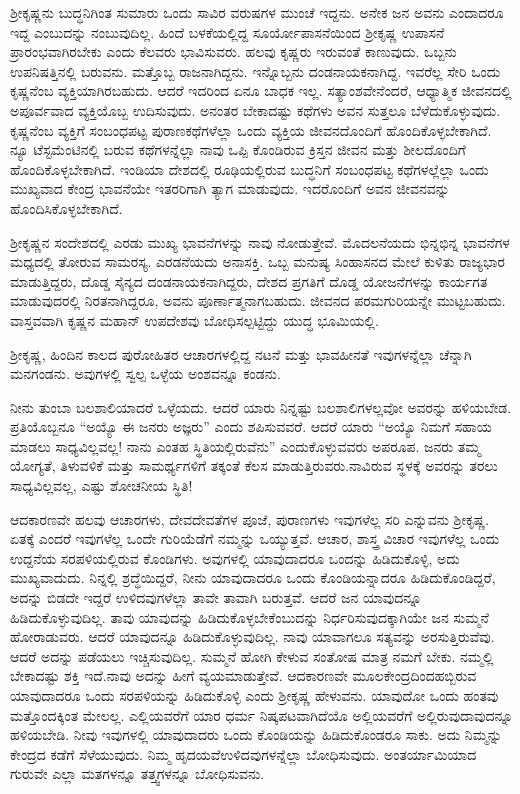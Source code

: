 ಶ‍್ರೀಕೃಷ್ಣನು ಬುದ್ಧನಿಗಿಂತ ಸುಮಾರು ಒಂದು ಸಾವಿರ ವರುಷಗಳ ಮುಂಚೆ ಇದ್ದನು. ಅನೇಕ ಜನ ಅವನು ಎಂದಾದರೂ ಇದ್ದ ಎಂಬುದನ್ನು ನಂಬುವುದಿಲ್ಲ. ಹಿಂದೆ ಬಳಕೆ\-ಯಲ್ಲಿದ್ದ ಸೂರ್ಯೋಪಾಸನೆಯಿಂದ ಶ‍್ರೀಕೃಷ್ಣ ಉಪಾಸನೆ ಪ್ರಾರಂಭವಾಗಿರಬೇಕು ಎಂದು ಕೆಲವರು ಭಾವಿಸುವರು. ಹಲವು ಕೃಷ್ಣರು ಇರುವಂತೆ ಕಾಣುವುದು. ಒಬ್ಬನು ಉಪನಿಷತ್ತಿನಲ್ಲಿ ಬರುವನು. ಮತ್ತೊಬ್ಬ ರಾಜನಾಗಿದ್ದನು. ಇನ್ನೊಬ್ಬನು ದಂಡನಾಯಕ\-ನಾಗಿದ್ದ. ಇವರೆಲ್ಲ ಸೇರಿ ಒಂದು ಕೃಷ್ಣನೆಂಬ ವ್ಯಕ್ತಿಯಾಗಿರಬಹುದು. ಆದರೆ ಇದರಿಂದ ಏನೂ ಬಾಧಕ ಇಲ್ಲ. ಸತ್ಯಾಂಶವೇನೆಂದರೆ, ಆಧ್ಯಾತ್ಮಿಕ ಜೀವನದಲ್ಲಿ ಅಪೂರ್ವವಾದ ವ್ಯಕ್ತಿಯೊಬ್ಬ ಉದಿಸುವುದು. ಅನಂತರ ಬೇಕಾದಷ್ಟು ಕಥೆಗಳು ಅವನ ಸುತ್ತಲೂ ಬೆಳೆದುಕೊಳ್ಳುವುದು. ಕೃಷ್ಣನೆಂಬ ವ್ಯಕ್ತಿಗೆ ಸಂಬಂಧಪಟ್ಟ ಪುರಾಣಕಥೆಗಳೆಲ್ಲಾ ಒಂದು ವ್ಯಕ್ತಿಯ ಜೀವನದೊಂದಿಗೆ ಹೊಂದಿಕೊಳ್ಳಬೇಕಾಗಿದೆ. ನ್ಯೂ ಟೆಸ್ಟಮೆಂಟಿನಲ್ಲಿ ಬರುವ ಕಥೆಗಳನ್ನೆಲ್ಲಾ ನಾವು ಒಪ್ಪಿ \-ಕೊಂಡಿರುವ ಕ್ರಿಸ್ತನ ಜೀವನ ಮತ್ತು ಶೀಲದೊಂದಿಗೆ ಹೊಂದಿಕೊಳ್ಳಬೇಕಾಗಿದೆ. ಇಂಡಿಯಾ ದೇಶದಲ್ಲಿ ರೂಢಿಯಲ್ಲಿರುವ ಬುದ್ಧನಿಗೆ ಸಂಬಂಧಪಟ್ಟ ಕಥೆಗಳಲ್ಲೆಲ್ಲಾ ಒಂದು ಮುಖ್ಯವಾದ ಕೇಂದ್ರ ಭಾವನೆಯೇ ಇತರರಿಗಾಗಿ ತ್ಯಾಗ ಮಾಡುವುದು. ಇದರೊಂದಿಗೆ ಅವನ ಜೀವನವನ್ನು ಹೊಂದಿಸಿಕೊಳ್ಳಬೇಕಾಗಿದೆ.

ಶ‍್ರೀಕೃಷ್ಣನ ಸಂದೇಶದಲ್ಲಿ ಎರಡು ಮುಖ್ಯ ಭಾವನೆಗಳನ್ನು ನಾವು ನೋಡುತ್ತೇವೆ. ಮೊದಲನೆಯದು ಭಿನ್ನಭಿನ್ನ ಭಾವನೆಗಳ ಮಧ್ಯದಲ್ಲಿ ತೋರುವ ಸಾಮರಸ್ಯ. ಎರಡನೆಯದು ಅನಾಸಕ್ತಿ. ಒಬ್ಬ ಮನುಷ್ಯ ಸಿಂಹಾಸನದ ಮೇಲೆ ಕುಳಿತು ರಾಜ್ಯಭಾರ ಮಾಡುತ್ತಿದ್ದರು, ದೊಡ್ಡ ಸೈನ್ಯದ ದಂಡನಾಯಕನಾಗಿದ್ದರು, ದೇಶದ ಪ್ರಗತಿಗೆ ದೊಡ್ಡ ಯೋಜನೆಗಳನ್ನು ಕಾರ್ಯಗತ ಮಾಡುವುದರಲ್ಲಿ ನಿರತನಾಗಿದ್ದರೂ, ಅವನು ಪೂರ್ಣಾತ್ಮನಾಗಬಹುದು. ಜೀವನದ ಪರಮಗುರಿಯನ್ನೇ ಮುಟ್ಟಬಹುದು. ವಾಸ್ತವವಾಗಿ ಕೃಷ್ಣನ ಮಹಾನ್​ ಉಪದೇಶವು ಬೋಧಿಸಲ್ಪಟ್ಟಿದ್ದು ಯುದ್ಧ ಭೂಮಿಯಲ್ಲಿ.

ಶ‍್ರೀಕೃಷ್ಣ, ಹಿಂದಿನ ಕಾಲದ ಪುರೋಹಿತರ ಆಚಾರಗಳಲ್ಲಿದ್ದ ನಟನೆ ಮತ್ತು ಭಾವಹೀನತೆ ಇವುಗಳನ್ನೆಲ್ಲಾ ಚೆನ್ನಾಗಿ ಮನಗಂಡನು. ಅವುಗಳಲ್ಲಿ ಸ್ವಲ್ಪ ಒಳ್ಳೆಯ ಅಂಶವನ್ನೂ ಕಂಡನು.

ನೀನು ತುಂಬಾ ಬಲಶಾಲಿಯಾದರೆ ಒಳ್ಳೆಯದು. ಆದರೆ ಯಾರು ನಿನ್ನಷ್ಟು ಬಲಶಾಲಿಗಳಲ್ಲವೋ ಅವರನ್ನು ಹಳಿಯಬೇಡ. ಪ್ರತಿಯೊಬ್ಬನೂ “ಅಯ್ಯೊ ಈ ಜನರು ಅಜ್ಞರು” ಎಂದು ಶಪಿಸುವವರೆ. ಆದರೆ ಯಾರು “ಅಯ್ಯೊ ನಿಮಗೆ ಸಹಾಯ ಮಾಡಲು ಸಾಧ್ಯವಿಲ್ಲವಲ್ಲ! ನಾನು ಎಂತಹ ಸ್ಥಿತಿಯಲ್ಲಿರುವೆನು” ಎಂದುಕೊಳ್ಳುವವರು ಅಪರೂಪ. ಜನರು ತಮ್ಮ ಯೋಗ್ಯತೆ, ತಿಳುವಳಿಕೆ ಮತ್ತು ಸಾಮರ್ಥ್ಯಗಳಿಗೆ ತಕ್ಕಂತೆ ಕೆಲಸ ಮಾಡುತ್ತಿರುವರು.\break ನಾವಿರುವ ಸ್ಥಳಕ್ಕೆ ಅವರನ್ನು ತರಲು ಸಾಧ್ಯವಿಲ್ಲವಲ್ಲ, ಎಷ್ಟು ಶೋಚನೀಯ ಸ್ಥಿತಿ!

ಆದಕಾರಣವೇ ಹಲವು ಆಚಾರಗಳು, ದೇವದೇವತೆಗಳ ಪೂಜೆ, ಪುರಾಣಗಳು ಇವುಗಳೆಲ್ಲ ಸರಿ ಎನ್ನುವನು ಶ‍್ರೀಕೃಷ್ಣ. ಏತಕ್ಕೆ ಎಂದರೆ ಇವುಗಳೆಲ್ಲ ಒಂದೇ ಗುರಿಯೆಡೆಗೆ ನಮ್ಮನ್ನು ಒಯ್ಯುತ್ತವೆ. ಆಚಾರ, ಶಾಸ್ತ್ರ ವಿಚಾರ ಇವುಗಳೆಲ್ಲ ಒಂದು ಉದ್ದನೆಯ ಸರಪಳಿ\-ಯಲ್ಲಿರುವ ಕೊಂಡಿಗಳು. ಅವುಗಳಲ್ಲಿ ಯಾವುದಾದರೂ ಒಂದನ್ನು ಹಿಡಿದುಕೊಳ್ಳಿ, ಅದು ಮುಖ್ಯವಾದುದು. ನಿನ್ನಲ್ಲಿ ಶ್ರದ್ಧೆಯಿದ್ದರೆ, ನೀನು ಯಾವುದಾದರೂ ಒಂದು ಕೊಂಡಿಯನ್ನಾ\-ದರೂ ಹಿಡಿದುಕೊಂಡಿದ್ದರೆ, ಅದನ್ನು ಬಿಡದೇ ಇದ್ದರೆ ಉಳಿದವುಗಳೆಲ್ಲಾ ತಾವೇ ತಾವಾಗಿ ಬರುತ್ತವೆ. ಆದರೆ ಜನ ಯಾವುದನ್ನೂ ಹಿಡಿದುಕೊಳ್ಳುವುದಿಲ್ಲ. ತಾವು ಯಾವುದನ್ನು ಹಿಡಿದುಕೊಳ್ಳಬೇಕೆಂಬುದನ್ನು ನಿರ್ಧರಿಸುವುದಕ್ಕಾಗಿಯೇ ಜನ ಸುಮ್ಮನೆ ಹೋರಾಡುವರು. ಆದರೆ ಯಾವುದನ್ನೂ ಹಿಡಿದುಕೊಳ್ಳುವುದಿಲ್ಲ. ನಾವು ಯಾವಾಗಲೂ ಸತ್ಯವನ್ನು ಅರಸುತ್ತಿರುವೆವು. ಆದರೆ ಅದನ್ನು ಪಡೆಯಲು ಇಚ್ಚಿಸುವುದಿಲ್ಲ. ಸುಮ್ಮನೆ ಹೋಗಿ ಕೇಳುವ ಸಂತೋಷ ಮಾತ್ರ ನಮಗೆ ಬೇಕು. ನಮ್ಮಲ್ಲಿ ಬೇಕಾದಷ್ಟು ಶಕ್ತಿ ಇದೆ.\break ನಾವು ಅದನ್ನು ಹೀಗೆ ವ್ಯಯಮಾಡುತ್ತೇವೆ. ಆದಕಾರಣವೇ ಮೂಲಕೇಂದ್ರದಿಂದ\break ಹಬ್ಬಿರುವ ಯಾವುದಾದರೂ ಒಂದು ಸರಪಳಿಯನ್ನು ಹಿಡಿದುಕೊಳ್ಳಿ ಎಂದು ಶ‍್ರೀಕೃಷ್ಣ ಹೇಳುವನು. ಯಾವುದೋ ಒಂದು ಹಂತವು ಮತ್ತೊಂದಕ್ಕಿಂತ ಮೇಲಲ್ಲ. ಎಲ್ಲಿಯವರೆಗೆ ಯಾರ ಧರ್ಮ ನಿಷ್ಕಪಟವಾಗಿದೆಯೊ ಅಲ್ಲಿಯವರೆಗೆ ಅಲ್ಲಿರುವುದಾವುದನ್ನೂ ಹಳಿಯಬೇಡಿ. ನೀವು ಇವುಗಳಲ್ಲಿ ಯಾವುದಾದರು ಒಂದು ಕೊಂಡಿಯನ್ನು ಹಿಡಿದು\break ಕೊಂಡರೂ ಸಾಕು. ಅದು ನಿಮ್ಮನ್ನು ಕೇಂದ್ರದ ಕಡೆಗೆ ಸೆಳೆಯುವುದು. ನಿಮ್ಮ ಹೃದಯವೆ\break ಉಳಿದವುಗಳನ್ನೆಲ್ಲಾ ಬೋಧಿಸುವುದು. ಅಂತರ್ಯಾಮಿಯಾದ ಗುರುವೇ ಎಲ್ಲಾ ಮತ\-ಗಳನ್ನೂ ತತ್ತ್ವಗಳನ್ನೂ ಬೋಧಿಸುವನು.

